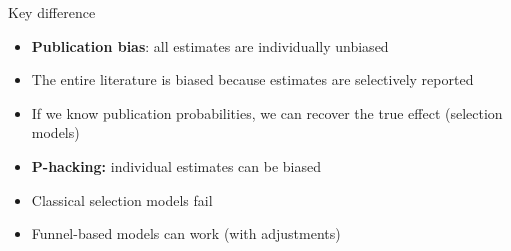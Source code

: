 \documentclass{beamer} %
\begin{document}
\begin{frame}{Key difference}
\begin{itemize}
	\item \textbf{Publication bias}: all estimates are individually unbiased
	\item The entire literature is biased because estimates are selectively reported
	\item If we know publication probabilities, we can recover the true effect (selection models)
	\item \textbf{P-hacking:} individual estimates can be biased
	\item Classical selection models fail
	\item Funnel-based models can work (with adjustments)
\end{itemize}
\end{frame}
\end{document}
